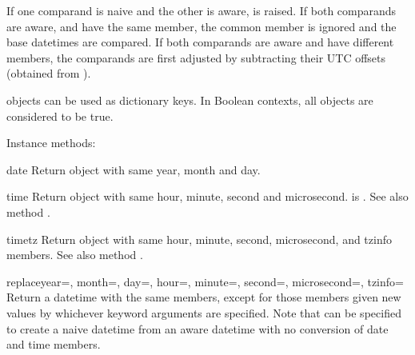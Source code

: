 \begin{description}
If one comparand is naive and
the other is aware,  is raised.  If both
    comparands are aware, and have the same  member,
    the common  member is ignored and the base datetimes
    are compared.  If both comparands are aware and have different
     members, the comparands are first adjusted by
    subtracting their UTC offsets (obtained from ).

\end{description}

 objects can be used as dictionary keys. In Boolean
contexts, all  objects are considered to be true.


Instance methods:

\begin{methoddesc}{date}{}
  Return  object with same year, month and day.
\end{methoddesc}

\begin{methoddesc}{time}{}
  Return  object with same hour, minute, second and microsecond.
   is .  See also method .
\end{methoddesc}

\begin{methoddesc}{timetz}{}
  Return  object with same hour, minute, second, microsecond,
  and tzinfo members.  See also method .
\end{methoddesc}

\begin{methoddesc}{replace}{year=, month=, day=, hour=, minute=, second=,
                            microsecond=, tzinfo=}
  Return a datetime with the same members, except for those members given
  new values by whichever keyword arguments are specified.  Note that
   can be specified to create a naive datetime from
  an aware datetime with no conversion of date and time members.
\end{methoddesc}

